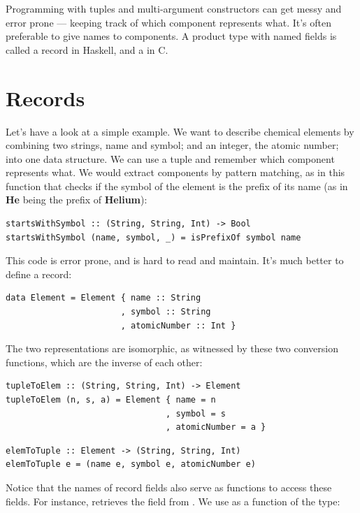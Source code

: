 Programming with tuples and multi-argument constructors can get messy
and error prone --- keeping track of which component represents what.
It's often preferable to give names to components. A product type with
named fields is called a record in Haskell, and a  in C.

\section{Records}\label{records}

Let's have a look at a simple example. We want to describe chemical
elements by combining two strings, name and symbol; and an integer, the
atomic number; into one data structure. We can use a tuple
 and remember which component represents
what. We would extract components by pattern matching, as in this
function that checks if the symbol of the element is the prefix of its
name (as in \textbf{He} being the prefix of \textbf{Helium}):

\begin{Verbatim}
startsWithSymbol :: (String, String, Int) -> Bool
startsWithSymbol (name, symbol, _) = isPrefixOf symbol name
\end{Verbatim}
This code is error prone, and is hard to read and maintain. It's much
better to define a record:

\begin{Verbatim}
data Element = Element { name :: String 
                       , symbol :: String 
                       , atomicNumber :: Int }
\end{Verbatim}
The two representations are isomorphic, as witnessed by these two
conversion functions, which are the inverse of each other:

\begin{Verbatim}
tupleToElem :: (String, String, Int) -> Element
tupleToElem (n, s, a) = Element { name = n 
                                , symbol = s 
                                , atomicNumber = a }
\end{Verbatim}

\begin{Verbatim}
elemToTuple :: Element -> (String, String, Int)
elemToTuple e = (name e, symbol e, atomicNumber e)
\end{Verbatim}
Notice that the names of record fields also serve as functions to access
these fields. For instance,  retrieves the
 field from . We use
 as a function of the type:


